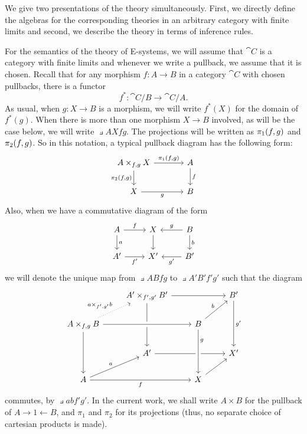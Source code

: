\documentclass{article}
\begin{document}
We give two presentations of the theory simultaneously. First, we directly
define the algebras for the corresponding theories in an arbitrary category
with finite limits and second, we describe the theory in terms of inference
rules.

For the semantics of the theory of E-systems, we will assume that $\cat{C}$ is a 
category with finite limits and
whenever we write a pullback, we assume that it is chosen. Recall that for
any morphism $f:A\to B$ in a category $\cat{C}$ with chosen pullbacks, there
is a functor
\begin{equation*}
f^\ast : \cat{C}/B\to\cat{C}/A.
\end{equation*}
As usual, when $g:X\to B$ is a morphism, we will write $f^\ast(X)$ for the
domain of $f^\ast(g)$. When there is more than one morphism $X\to B$ involved,
as will be the case below, we will write $\pullback{A}{X}{f}{g}$. The projections
will be written as $\pi_{1}(f,g)$ and $\pi_{2}(f,g)$. So in this notation, a
typical pullback diagram has the following form:
\begin{equation*}
\begin{tikzcd}[column sep=large]
\pullback{A}{X}{f}{g}
  \ar{r}{\pullbackpr{1}{f}{g}}
  \ar{d}[swap]{\pullbackpr{2}{f}{g}}
  &
A \ar{d}{f}
  \\
X \ar{r}[swap]{g}
  &
B
\end{tikzcd}
\end{equation*}
Also, when we have a commutative diagram of the form
\begin{equation*}
\begin{tikzcd}
A \ar{r}{f}
  \ar{d}{a}
  &
X \ar{d}
  & 
B \ar{l}[swap]{g}
  \ar{d}{b}
  \\
A'
  \ar{r}[swap]{f'}
  &
X'
  &
B'
  \ar{l}{g'}
\end{tikzcd}
\end{equation*}
we will denote the unique map from $\pullback{A}{B}{f}{g}$ to $\pullback{A'}{B'}{f'}{g'}$
such that the diagram
\begin{equation*}
\begin{tikzcd}
  {}
  & 
\pullback{A'}{B'}{f'}{g'}
  \ar{dd}
  \ar{rr}
  &
  &
B'
  \ar{dd}{g'}
  \\
\pullback{A}{B}{f}{g}
  \ar{dd}
  \ar[crossing over]{rr}
  \ar[dotted]{ur}{\pullback{a}{b}{f'}{g'}}
  &
  &
B \ar{ur}{b}
  \\
  {}
  &
A'
  \ar{rr}
  &
  &
X'
  \\
A \ar{rr}[swap]{f}
  \ar{ur}{a}
  &
  &
X \ar[crossing over,leftarrow]{uu}[near end,swap]{g}
  \ar{ur}
\end{tikzcd}
\end{equation*}
commutes, by $\pullback{a}{b}{f'}{g'}$. In the current work, we shall
write $A\times B$ for the pullback of $A\rightarrow 1\leftarrow B$, and
$\pi_1$ and $\pi_2$ for its projections (thus, no separate choice of
cartesian products is made).
\end{document}
